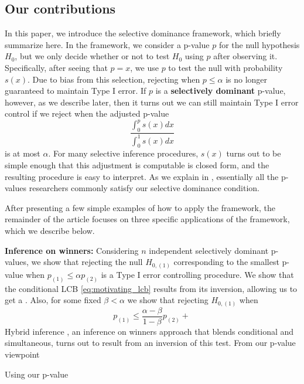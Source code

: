 \documentclass{article}
\begin{document}
\subsection{Our contributions}

In this paper, we introduce the selective dominance framework, which briefly summarize here. In the framework, we consider a p-value $p$ for the null hypothesis $H_0$, but we only decide whether or not to test $H_0$ using $p$ after observing it. Specifically, after seeing that $p=x$, we use $p$ to test the null with probability $s(x)$. Due to bias from this selection, rejecting when $p \leq \alpha$ is no longer guaranteed to maintain Type I error. If $p$ is a \textbf{selectively dominant} p-value, however, as we describe later, then it turns out we can still maintain Type I error control if we reject when the adjusted p-value 
\begin{equation*}
    \frac{\int_0^p s(x) dx}{\int_0^1 s(x) dx}
\end{equation*}
is at most $\alpha$. For many selective inference procedures, $s(x)$ turns out to be simple enough that this adjustment is computable is closed form, and the resulting procedure is easy to interpret. As we explain in , essentially all the p-values researchers commonly satisfy our selective dominance condition. 


After presenting a few simple examples of how to apply the framework, the remainder of the article focuses on three specific applications of the framework, which we describe below. \newline 


\noindent \textbf{Inference on winners: } Considering $n$ independent selectively dominant p-values, we show that rejecting the null $H_{0, (1)}$ corresponding to the smallest p-value when $p_{(1)} \leq \alpha p_{(2)}$ is a Type I error controlling procedure. We show that the conditional LCB \eqref{eq:motivating_lcb} results from its inversion, allowing us to get a . Also, for some fixed $\beta < \alpha$ we show that rejecting $H_{0, (1)}$ when 
\begin{equation*}
    p_{(1)} \leq \frac{\alpha - \beta}{1- \beta} p_{(2)} + \frac{}{}
\end{equation*}
Hybrid inference \cite{Andrews2023}, an inference on winners approach that blends conditional and simultaneous, turns out to result from an inversion of this test. From our p-value viewpoint 


Using our p-value 
\end{document}
